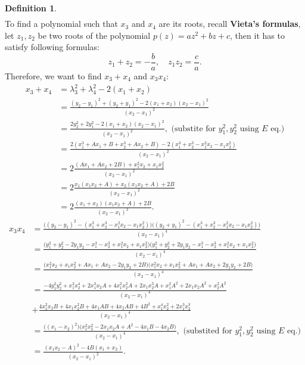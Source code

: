 \documentclass[thesis=M,english]{FITthesis}[2012/10/20]
\theoremstyle{remark}
\theoremstyle{definition}
\newtheorem{DF}{Definition}[section]
\begin{document}
\begin{DF}
\begin{align*}
\end{align*}
To find a polynomial such that $x_3$ and $x_4$ are its roots, recall \textbf{Vieta's formulas}, let $z_1, z_2$ be two roots of the polynomial $p(z) = az^2 + bz + c$, then it has to satisfy following formulas:
$$
z_1 + z_2 = -\frac{b}{a},\quad z_1z_2 = \frac{c}{a}.
$$
Therefore, we want to find $x_3 + x_4$ and $x_3 x_4$:
\begin{align*}
x_3 + x_4 &= \lambda_3^2 + \lambda_4^2 - 2(x_1+x_2) \\
&= \frac{(y_2-y_1)^2 + (y_2+y_1)^2 -2(x_1+x_2)(x_2-x_1)^2}{(x_2-x_1)^2} \\
&= \frac{2y_2^2+2y_1^2 -2(x_1+x_2)(x_2-x_1)^2}{(x_2-x_1)^2}, \text{ (substite for $y_1^2,y_2^2$ using $E$ eq.)} \\
&= \frac{2(x_1^3+Ax_1+B+x_2^3+Ax_2+B) -2(x_1^3+x_2^3-x_1^2x_2-x_1x_2^2)}{(x_2-x_1)^2}\\
&= 2\frac{(Ax_1+Ax_2+2B) +x_1^2x_2+x_1x_2^2}{(x_2-x_1)^2} \\
&= 2\frac{x_1(x_1x_2 + A) + x_2(x_1x_2 + A)+2B}{(x_2-x_1)^2}\\ 
&= 2\frac{(x_1 + x_2)(x_1x_2 + A)+2B}{(x_2-x_1)^2}.
\end{align*}
\begin{align*}
x_3x_4 &= \frac{\bigg((y_2-y_1)^2 -(x_1^3+x_2^3-x_1^2x_2-x_1x_2^2)\bigg)\bigg((y_2+y_1)^2-(x_1^3+x_2^3-x_1^2x_2-x_1x_2^2)\bigg)}{(x_2-x_1)^4} \\
&= \frac{\bigg(y_1^2 + y_2^2 -2y_1y_2 -x_1^3-x_2^3+x_1^2x_2+x_1x_2^2\bigg)\bigg(y_1^2 + y_2^2 +2y_1y_2 -x_1^3-x_2^3+x_1^2x_2+x_1x_2^2\bigg)}{(x_2-x_1)^4}\\
&= \frac{\bigg(x_1^2x_2 + x_1x_2^2 + Ax_1 + Ax_2 - 2y_1y_2 + 2B\bigg)\bigg(x_1^2x_2 + x_1x_2^2 + Ax_1 + Ax_2 + 2y_1y_2 + 2B\bigg)}{(x_2-x_1)^4}\\
&= \frac{- 4 y_{1}^{2} y_{2}^{2} + x_{1}^{2} x_{2}^{4} + 2 x_{1}^{3} x_{2} A + 4 x_{1}^{2} x_{2}^{2} A + 2 x_{1} x_{2}^{3} A + x_{1}^{2} A^{2} + 2 x_{1} x_{2} A^{2} + x_{2}^{2} A^{2}}{(x_2-x_1)^4} \\
&+ \frac{4 x_{1}^{2} x_{2} B + 4 x_{1} x_{2}^{2} B + 4 x_{1} A B + 4 x_{2} A B + 4 B^{2} + x_{1}^{4} x_{2}^{2} + 2 x_{1}^{3} x_{2}^{3}}{(x_2-x_1)^4} \\
&= \frac{\bigg((x_1-x_2)^2\bigg)\bigg(x_{1}^{2} x_{2}^{2} - 2 x_{1} x_{2} A + A^{2} - 4 x_{1} B - 4 x_{2} B\bigg)}{(x_2-x_1)^4}, \text{ (substited for $y_1^2,y_2^2$ using $E$ eq.)}\\
&= \frac{(x_1x_2-A)^2 - 4B(x_1+x_2)}{(x_2-x_1)^2}.
\end{align*}

\end{DF}
\end{document}
